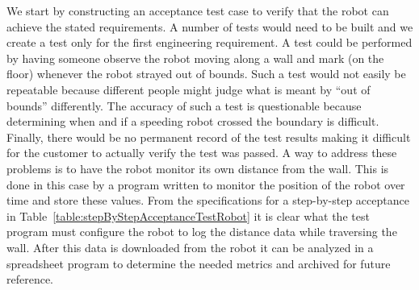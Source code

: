 We start by constructing an acceptance test case to verify that the
robot can achieve the stated requirements. A number of tests would need
to be built and we create a test only for the first engineering
requirement. A test could be performed by having someone observe the
robot moving along a wall and mark (on the floor) whenever the robot
strayed out of bounds. Such a test would not easily be repeatable
because different people might judge what is meant by ``out of bounds''
differently. The accuracy of such a test is questionable because
determining when and if a speeding robot crossed the boundary is
difficult. Finally, there would be no permanent record of the test
results making it difficult for the customer to actually verify the test
was passed. A way to address these problems is to have the robot monitor
its own distance from the wall. This is done in this case by a program
written to monitor the position of the robot over time and store these
values. From the specifications for a step-by-step acceptance in 
Table~\ref{table:stepByStepAcceptanceTestRobot}
it is clear what the test program must configure the robot to log
the distance data while traversing the wall. After this data is
downloaded from the robot it can be analyzed in a spreadsheet program to
determine the needed metrics and archived for future reference.

